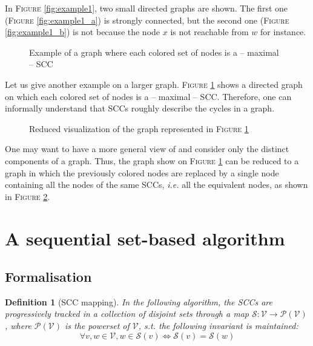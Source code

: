 \documentclass[a4 paper, 12pt]{article}
\def\VV{\ensuremath{\mathcal{V}}}
\newtheorem{definition}{Definition}
\begin{document}
In \textsc{Figure} \ref{fig:example1}, two small directed graphs are shown. The first one (\textsc{Figure} \ref{fig:example1_a}) is strongly connected, but the second one (\textsc{Figure} \ref{fig:example1_b}) is not because the node $x$ is not reachable from $w$ for instance.

\begin{figure}[!h]
    \caption{Example of a graph where each colored set of nodes is a -- maximal -- SCC\label{fig:exampleSCC}}
\end{figure}

Let us give another example on a larger graph. \textsc{Figure} \ref{fig:exampleSCC} shows a directed graph on which each colored set of nodes is a -- maximal -- SCC. Therefore, one can informally understand that SCCs roughly describe the cycles in a graph.

\begin{figure}[!h]
    \caption{Reduced visualization of the graph represented in \textsc{Figure} \ref{fig:exampleSCC}}\label{fig:exampleSCCreduced}
\end{figure}

One may want to have a more general view of and consider only the distinct components of a graph. Thus, the graph show on \textsc{Figure} \ref{fig:exampleSCC} can be reduced to a graph in which the previously colored nodes are replaced by a single node containing all the nodes of the same SCCs, \textit{i.e.} all the equivalent nodes, as shown in \textsc{Figure} \ref{fig:exampleSCCreduced}.



\section{A sequential set-based algorithm}
\subsection{Formalisation}
\begin{definition}[SCC mapping]
    In the following algorithm, the SCCs are progressively tracked in a collection of disjoint sets through a map $\mathcal{S} : \mathcal{V} \longrightarrow \mathcal{P}(\mathcal{V})$, where $\mathcal{P}(\mathcal{V})$ is the powerset of \VV, s.t. the following invariant is maintained:
    \begin{equation}\label{invariant:Sdisjoint}
        \forall v, w \in \mathcal{V}, w\in \mathcal{S}(v) \Longleftrightarrow \mathcal{S}(v) = \mathcal{S}(w)
    \end{equation}
\end{definition}
\end{document}
